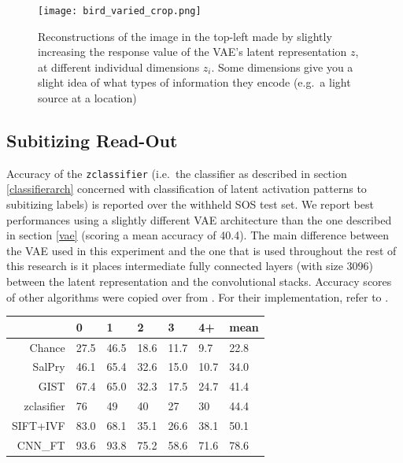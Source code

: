 \documentclass[twocolumn]{article}
\begin{document}
{%

\begin{figure}
\centering
\texttt{[image: bird\_varied\_crop.png]}
\caption{Reconstructions of the image in the top-left made by slightly
increasing the response value of the VAE's latent representation \(z\),
at different individual dimensions \(z_i\). Some dimensions give
you a slight idea of what types of information they encode (e.g.~a light source at a
location)}
\label{fig:latent}
\end{figure}

\hypertarget{subitizing-read-out}{%
\subsection{Subitizing Read-Out}\label{subitizing-read-out}}

Accuracy of the \texttt{zclassifier} (i.e.~the classifier as described
in section \ref{classifierarch} concerned
with classification of latent activation patterns to subitizing labels)
is reported over the withheld SOS test set. We report best performances
using a slightly different VAE architecture than the one described in
section \ref{vae} (scoring a mean accuracy of 40.4).
The main difference between the VAE used in this experiment and the one
that is used throughout the rest of this research is it places
intermediate fully connected layers (with size 3096) between the latent
representation and the convolutional stacks. Accuracy scores of other
algorithms were copied over from \citet{zhang2016salient}. For their
implementation, refer to \citet{zhang2016salient}.

\begin{longtable}[]{@{}rllllll@{}}
\toprule
& 0 & 1 & 2 & 3 & 4+ & mean\tabularnewline
\midrule
\endhead
Chance & 27.5 & 46.5 & 18.6 & 11.7 & 9.7 & 22.8\tabularnewline
SalPry & 46.1 & 65.4 & 32.6 & 15.0 & 10.7 & 34.0\tabularnewline
GIST & 67.4 & 65.0 & 32.3 & 17.5 & 24.7 & 41.4\tabularnewline
zclasifier & 76 & 49 & 40 & 27 & 30 & 44.4\tabularnewline
SIFT+IVF & 83.0 & 68.1 & 35.1 & 26.6 & 38.1 & 50.1\tabularnewline
CNN\_FT & 93.6 & 93.8 & 75.2 & 58.6 & 71.6 & 78.6\tabularnewline
\bottomrule
\end{longtable}


}
\end{document}
